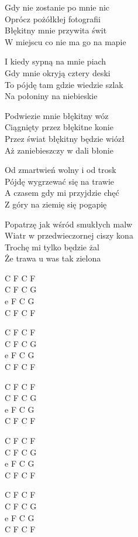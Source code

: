 \begin{text}
    Gdy nie zostanie po mnie nic\\
    Oprócz pożółkłej fotografii\\
    Błękitny mnie przywita świt	\\
    W miejscu co nie ma go na mapie

    I kiedy sypną na mnie piach\\
    Gdy mnie okryją cztery deski\\
    To pójdę tam gdzie wiedzie szlak\\
    Na połoniny na niebieskie

    Podwiezie mnie błękitny wóz\\
    Ciągnięty przez błękitne konie\\
    Przez świat błękitny będzie wiózł\\
    Aż zaniebieszczy w dali błonie

    Od zmartwień wolny i od trosk\\
    Pójdę wygrzewać się na trawie\\
    A czasem gdy mi przyjdzie chęć\\
    Z góry na ziemię się pogapię

    Popatrzę jak wśród smukłych malw\\
    Wiatr w przedwieczornej ciszy kona\\
    Trochę mi tylko będzie żal\\
    Że trawa u was tak zielona
\end{text}
\begin{chord}
    C F C F\\
    C F C G\\
    e F C G\\
    C F C F
    
    C F C F\\
    C F C G\\
    e F C G\\
    C F C F
    
    C F C F\\
    C F C G\\
    e F C G\\
    C F C F
    
    C F C F\\
    C F C G\\
    e F C G\\
    C F C F
    
    C F C F\\
    C F C G\\
    e F C G\\
    C F C F
\end{chord}